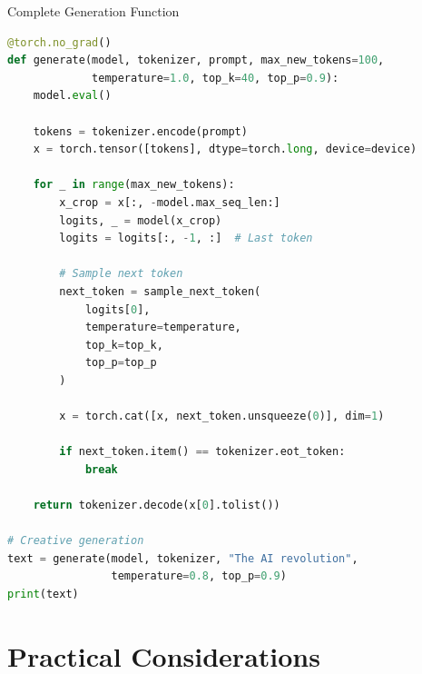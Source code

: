 \documentclass[aspectratio=169]{beamer}
\begin{document}
\begin{frame}[fragile]{Complete Generation Function 🎨}
\begin{lstlisting}[language=Python]
@torch.no_grad()
def generate(model, tokenizer, prompt, max_new_tokens=100,
             temperature=1.0, top_k=40, top_p=0.9):
    model.eval()

    tokens = tokenizer.encode(prompt)
    x = torch.tensor([tokens], dtype=torch.long, device=device)

    for _ in range(max_new_tokens):
        x_crop = x[:, -model.max_seq_len:]
        logits, _ = model(x_crop)
        logits = logits[:, -1, :]  # Last token

        # Sample next token
        next_token = sample_next_token(
            logits[0],
            temperature=temperature,
            top_k=top_k,
            top_p=top_p
        )

        x = torch.cat([x, next_token.unsqueeze(0)], dim=1)

        if next_token.item() == tokenizer.eot_token:
            break

    return tokenizer.decode(x[0].tolist())

# Creative generation
text = generate(model, tokenizer, "The AI revolution",
                temperature=0.8, top_p=0.9)
print(text)
\end{lstlisting}
\end{frame}

\section{Practical Considerations}
\end{document}
